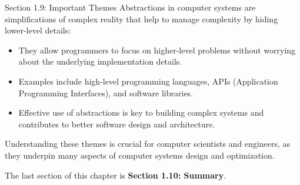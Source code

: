 \begin{notes}{Section 1.9: Important Themes}
    Abstractions in computer systems are simplifications of complex reality that help to manage complexity by hiding lower-level details:

    \begin{itemize}
        \item They allow programmers to focus on higher-level problems without worrying about the underlying implementation details.
        \item Examples include high-level programming languages, APIs (Application Programming Interfaces), and software libraries.
        \item Effective use of abstractions is key to building complex systems and contributes to better software design and architecture.
    \end{itemize}
    
    Understanding these themes is crucial for computer scientists and engineers, as they underpin many aspects of computer systems design and optimization.
\end{notes}

The last section of this chapter is \textbf{Section 1.10: Summary}.

